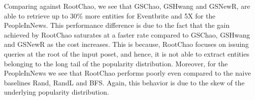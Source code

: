 Comparing against RootChao, we see that GSChao, GSHwang and GSNewR, are able to retrieve up to 30\% more entities for Eventbrite and 5X for the PeopleInNews. This performance difference is due to the fact that the gain achieved by RootChao saturates at a faster rate compared to GSChao, GSHwang and GSNewR as the cost increases. This is because, RootChao focuses on issuing queries at the root of the input poset, and hence, it is not able to extract entities belonging to the long tail of the popularity distribution. Moreover, for the PeopleInNews we see that RootChao performs poorly even compared to the naive baselines Rand, RandL and BFS. Again, this behavior is due to the skew of the underlying popularity distribution.

\begin{figure}[h]
\begin{center}

\end{center}
\end{figure}
